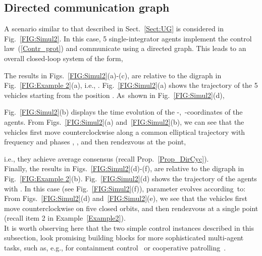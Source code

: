 \documentclass[letterpaper,9pt,twocolumn]{autart}
\begin{document}
\vspace{-0.08cm}
\subsection{Directed communication graph}\label{Sect:DG}
\vspace{-0.1cm}
A scenario similar to that described in Sect.~\ref{Sect:UG} is considered in Fig.~\ref{FIG:Simul2}.
In this case, 5 single-integrator agents implement the control law~(\ref{Contr_prot}) and 
communicate using a directed graph. This leads to an overall closed-loop system of the form,

The results in Figs.~\ref{FIG:Simul2}(a)-(c), are relative to
the digraph in Fig.~\ref{FIG:Example 2}(a), i.e., . Fig.~\ref{FIG:Simul2}(a) shows the trajectory of the
5 vehicles starting from the position .
As~shown in Fig.~\ref{FIG:Simul2}(d),\vspace{-0.1cm}

Fig.~\ref{FIG:Simul2}(b) displays the time evolution of the \mbox{-, }-coordinates of the
agents. From Figs.~\ref{FIG:Simul2}(a) and~\ref{FIG:Simul2}(b), we can see that the vehicles first
move counterclockwise along a common elliptical trajectory with frequency  and phases , , 
and then rendezvous at the point,\vspace{-0.1cm}
 
i.e., they achieve average consensus (recall Prop.~\ref{Prop_DirCyc}).\\
Finally, the results in Figs.~\ref{FIG:Simul2}(d)-(f), are relative to
the digraph in Fig.~\ref{FIG:Example 2}(b). Fig.~\ref{FIG:Simul2}(d) shows the trajectory of the
agents with \!.
In this case (see Fig.~\ref{FIG:Simul2}(f)), parameter  evolves
\mbox{according to:}\vspace{-0.1cm} 
From Figs.~\ref{FIG:Simul2}(d) and~\ref{FIG:Simul2}(e), we see
that the vehicles first move counterclockwise on five closed orbits, and then
rendezvous at a single point (recall item 2 in \mbox{Example~\ref{Example2}}).\\
It is worth observing here that the two simple control instances described in
this subsection, look promising building blocks for more sophisticated multi-agent 
tasks, such as, e.g., for containment control~\cite{JiFeEgBu_TAC08} or cooperative patrolling~\cite{PasqualettiFrBu_TRO12}.


\vspace{-0.25cm}
\end{document}
